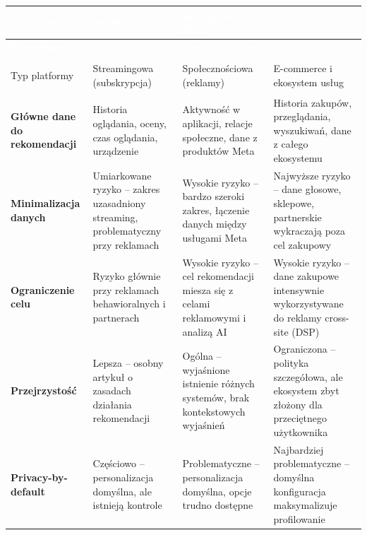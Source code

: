 \documentclass[12pt, a4paper]{article}
\begin{document}
\begin{longtable}{>{\bfseries\small}p{3.4cm}
                  >{\small\raggedright}p{3.4cm}
                  >{\small\raggedright}p{3.4cm}
                  >{\small\raggedright\arraybackslash}p{3.4cm}}
  \toprule
  \rowcolor{headerblue}
  \textcolor{white}{Kryterium} &
  \textcolor{white}{Netflix} &
  \textcolor{white}{Instagram / Meta} &
  \textcolor{white}{Amazon} \\
  \midrule
  \endfirsthead
  \toprule
  \rowcolor{headerblue}
  \textcolor{white}{Kryterium} &
  \textcolor{white}{Netflix} &
  \textcolor{white}{Instagram / Meta} &
  \textcolor{white}{Amazon} \\
  \midrule
  \endhead
  \bottomrule
  \endfoot

  \rowcolor{lightblue}
  Typ platformy &
  Streamingowa (subskrypcja) &
  Społecznościowa (reklamy) &
  E-commerce i ekosystem usług \\

  Główne dane do rekomendacji &
  Historia oglądania, oceny, czas oglądania, urządzenie &
  Aktywność w aplikacji, relacje społeczne, dane z produktów Meta &
  Historia zakupów, przeglądania, wyszukiwań, dane z całego ekosystemu \\

  \rowcolor{lightblue}
  Minimalizacja danych &
  Umiarkowane ryzyko -- zakres uzasadniony streaming, problematyczny przy reklamach &
  Wysokie ryzyko -- bardzo szeroki zakres, łączenie danych między usługami Meta &
  Najwyższe ryzyko -- dane głosowe, sklepowe, partnerskie wykraczają poza cel zakupowy \\

  Ograniczenie celu &
  Ryzyko głównie przy reklamach behawioralnych i partnerach &
  Wysokie ryzyko -- cel rekomendacji miesza się z celami reklamowymi i analizą AI &
  Wysokie ryzyko -- dane zakupowe intensywnie wykorzystywane do reklamy cross-site (DSP) \\

  \rowcolor{lightblue}
  Przejrzystość &
  Lepsza -- osobny artykuł o zasadach działania rekomendacji &
  Ogólna -- wyjaśnione istnienie różnych systemów, brak kontekstowych wyjaśnień &
  Ograniczona -- polityka szczegółowa, ale ekosystem zbyt złożony dla przeciętnego użytkownika \\

  Privacy-by-default &
  Częściowo -- personalizacja domyślna, ale istnieją kontrole &
  Problematyczne -- personalizacja domyślna, opcje trudno dostępne &
  Najbardziej problematyczne -- domyślna konfiguracja maksymalizuje profilowanie \\


\end{longtable}
\end{document}
